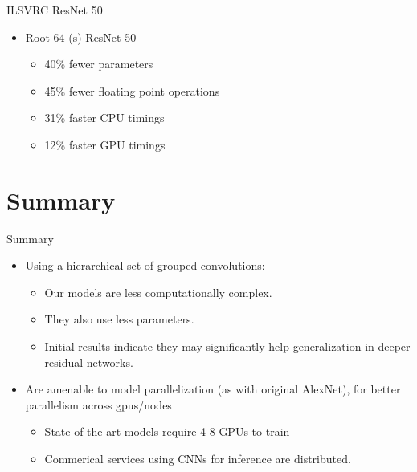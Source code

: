 \documentclass[t,xcolor=dvipsnames]{beamer}
\begin{document}
%
\begin{frame}{ILSVRC ResNet 50}

%
\begin{itemize}
\item Root-64 (s) ResNet 50
    \begin{itemize}
        \item 40\% fewer parameters
        \item 45\% fewer floating point operations
        \item 31\% faster CPU timings
        \item 12\% faster GPU timings
    \end{itemize}
\end{itemize}

\end{frame}

\section*{Summary}

\begin{frame}{Summary}

  \begin{itemize}
	\item Using a hierarchical set of grouped convolutions:
	\begin{itemize}
    	\item Our models are \alert{less computationally complex}.
	    \item They also use \alert{less parameters}.
	    \item Initial results indicate they may significantly help generalization in deeper residual networks.
	\end{itemize}
	\item Are amenable to \alert{model parallelization} (as with original AlexNet), for better parallelism across gpus/nodes
	\begin{itemize}
	    \item State of the art models require 4-8 GPUs to train
	    \item Commerical services using CNNs for inference are distributed.
	\end{itemize}
  \end{itemize}
\end{frame}
\end{document}

